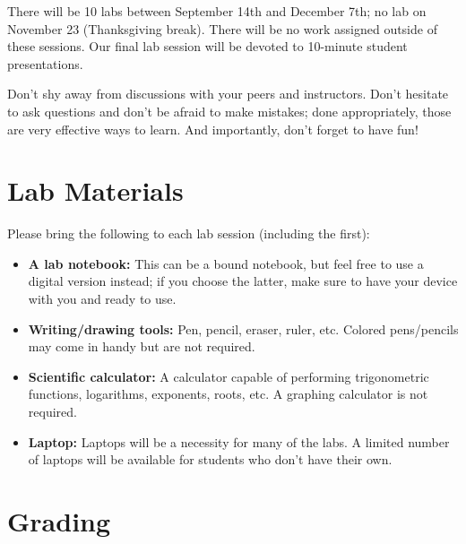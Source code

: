 \documentclass[11pt]{article}
\begin{document}
\bigskip
 
\noindent There will be 10 labs between September 14th and December 7th; no lab on November 23 (Thanksgiving break). There will be no work assigned outside of these sessions. Our final lab session will be devoted to 10-minute student presentations.

\noindent Don't shy away from discussions with your peers and instructors. Don't hesitate to ask questions and don't be afraid to make mistakes; done appropriately, those are very effective ways to learn. And importantly, don't forget to have fun!
 
\section*{Lab Materials}
 
Please bring the following to each lab session (including the first):
 
\begin{itemize}
\item \textbf{A lab notebook:} This can be a bound notebook, but feel free to use a digital version instead; if you choose the latter, make sure to have your device with you and ready to use.  
\item \textbf{Writing/drawing tools:} Pen, pencil, eraser, ruler, etc. Colored pens/pencils may come in handy but are not required.
\item \textbf{Scientific calculator:}  A calculator capable of performing trigonometric functions, logarithms, exponents, roots, etc. A graphing calculator is not required. 
\item \textbf{Laptop:} Laptops will be a necessity for many of the labs.  A limited number of laptops will be available for students who don't have their own. \\
\end{itemize}
 
\section*{Grading}
\end{document}
